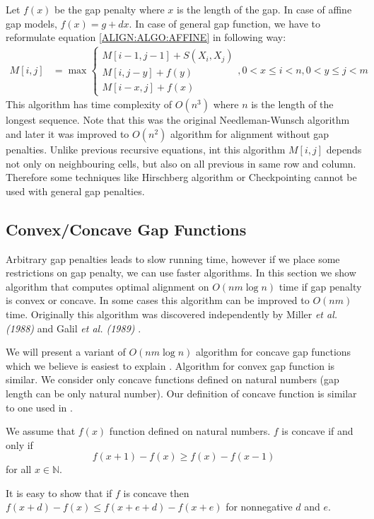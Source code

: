 Let $f(x)$ be the gap penalty where $x$ is the length of the gap. In case of
affine gap models, $f(x)=g+dx$. In case of general gap function, we have to
reformulate equation \ref{ALIGN:ALGO:AFFINE} in following way:
\begin{align}
M[i,j] &= \max
\begin{cases}
 M[i-1,j-1]+S(X_i,X_j)\\
 M[i,j-y]+f(y)\\
 M[i-x,j]+f(x)
\end{cases}, 0<x\leq i<n,0<y\leq j<m\label{ALIGN:ARBITRARYGAPEQUATION}
\end{align}
This algorithm has time complexity of $O(n^3)$ where $n$ is the length of the
longest sequence. Note that this was the original Needleman-Wunsch 
algorithm \cite{Needleman1970} and later it was improved to $O(n^2)$ algorithm
\cite{Sankoff1972} for alignment without gap penalties.
Unlike previous recursive equations, int this algorithm $M[i,j]$ depends not
only on neighbouring cells, but also on all previous in same row and column.
Therefore some techniques like Hirschberg algorithm or Checkpointing cannot be
used with general gap penalties.

\subsection{Convex/Concave Gap Functions}\label{SECTION:CONVEX}

Arbitrary gap penalties leads to slow running time, however if we place some
restrictions on gap penalty, we can use faster algorithms. In this section we
show algorithm that computes optimal alignment on $O(nm\log n)$ time if gap
penalty is convex or concave. In some cases this algorithm can be improved to
$O(nm)$ time. Originally this algorithm was discovered independently by Miller
{\it et al. (1988)} and Galil {\it et al. (1989)} \nocite{Miller1988,Galil1989}.

We will present a variant of $O(nm\log n)$ algorithm for concave gap functions which
we believe is easiest to explain . Algorithm for convex gap function is similar.
We consider only concave functions defined on natural numbers (gap length can be only
natural number). Our definition of concave function is similar to one used in
\cite{GusfieldBook}.

\begin{definition}
We assume that $f(x)$ function defined on natural numbers. $f$
is concave if and only if 
\[f(x+1)-f(x)\geq f(x)-f(x-1)\]
for all $x\in\mathbb{N}$.
\end{definition}
\begin{note}
It is easy to show that if $f$ is concave then $f(x+d)-f(x) \leq f(x+e+d) -
f(x+e)$ for nonnegative $d$ and $e$.
\end{note}


